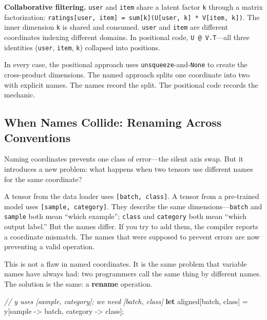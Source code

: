 \documentclass[11pt,titlepage]{article}
\newenvironment{Shaded}{}{}
\newcommand{\CommentTok}[1]{\textcolor[rgb]{0.38,0.63,0.69}{\textit{#1}}}
\newcommand{\KeywordTok}[1]{\textcolor[rgb]{0.00,0.44,0.13}{\textbf{#1}}}
\newcommand{\NormalTok}[1]{#1}
\newcommand{\OperatorTok}[1]{\textcolor[rgb]{0.40,0.40,0.40}{#1}}
\begin{document}
\textbf{Collaborative filtering.} \texttt{user} and \texttt{item} share
a latent factor \texttt{k} through a matrix factorization:
\texttt{ratings{[}user,\ item{]}\ =\ sum{[}k{]}(U{[}user,\ k{]}\ *\ V{[}item,\ k{]})}.
The inner dimension \texttt{k} is shared and consumed. \texttt{user} and
\texttt{item} are different coordinates indexing different domains. In
positional code, \texttt{U\ @\ V.T}---all three identities
(\texttt{user}, \texttt{item}, \texttt{k}) collapsed into positions.

In every case, the positional approach uses
\texttt{unsqueeze}-and-\texttt{None} to create the cross-product
dimensions. The named approach splits one coordinate into two with
explicit names. The names record the split. The positional code records
the mechanic.

\vspace{2em}

\hypertarget{when-names-collide-renaming-across-conventions}{%
\subsection{When Names Collide: Renaming Across
Conventions}\label{when-names-collide-renaming-across-conventions}}

Naming coordinates prevents one class of error---the silent axis swap.
But it introduces a new problem: what happens when two tensors use
different names for the same coordinate?

A tensor from the data loader uses \texttt{{[}batch,\ class{]}}. A
tensor from a pre-trained model uses \texttt{{[}sample,\ category{]}}.
They describe the same dimensions---\texttt{batch} and \texttt{sample}
both mean ``which example''; \texttt{class} and \texttt{category} both
mean ``which output label.'' But the names differ. If you try to add
them, the compiler reports a coordinate mismatch. The names that were
supposed to prevent errors are now preventing a valid operation.

This is not a flaw in named coordinates. It is the same problem that
variable names have always had: two programmers call the same thing by
different names. The solution is the same: a \textbf{rename} operation.

\begin{Shaded}
\begin{Highlighting}[]
\CommentTok{// y uses [sample, category]; we need [batch, class]}
\KeywordTok{let}\NormalTok{ aligned}\OperatorTok{[}\NormalTok{batch, class}\OperatorTok{]}\NormalTok{ = y}\OperatorTok{[}\NormalTok{sample -> batch, category -> class}\OperatorTok{]}\NormalTok{;}
\end{Highlighting}
\end{Shaded}
\end{document}
